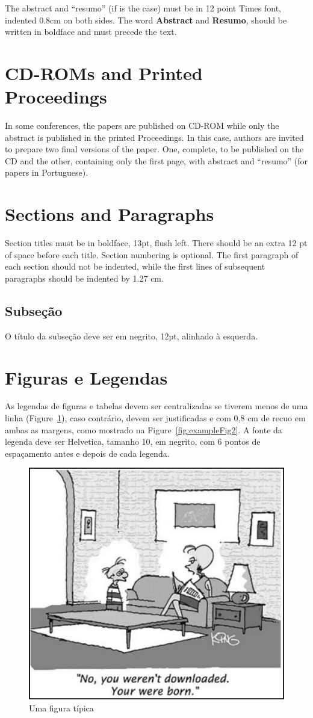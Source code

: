 \documentclass[12pt]{article}
\begin{document}
The abstract and ``resumo'' (if is the case) must be in 12 point Times font,
indented 0.8cm on both sides. The word \textbf{Abstract} and \textbf{Resumo},
should be written in boldface and must precede the text.

\section{CD-ROMs and Printed Proceedings}

In some conferences, the papers are published on CD-ROM while only the
abstract is published in the printed Proceedings. In this case, authors are
invited to prepare two final versions of the paper. One, complete, to be
published on the CD and the other, containing only the first page, with
abstract and ``resumo'' (for papers in Portuguese).

\section{Sections and Paragraphs}

Section titles must be in boldface, 13pt, flush left. There should be an extra
12 pt of space before each title. Section numbering is optional. The first
paragraph of each section should not be indented, while the first lines of
subsequent paragraphs should be indented by 1.27 cm.

\subsection{Subseção}

O título da subseção deve ser em negrito, 12pt, alinhado à esquerda.

\section{Figuras e Legendas}\label{sec:figs}

As legendas de figuras e tabelas devem ser centralizadas se tiverem menos de uma linha (Figure~\ref{fig:exampleFig1}), caso contrário, devem ser justificadas e com 0,8 cm de recuo em ambas as margens, como mostrado na Figure~\ref{fig:exampleFig2}. A fonte da legenda deve ser Helvetica, tamanho 10, em negrito, com 6 pontos de espaçamento antes e depois de cada legenda.

\begin{figure}[ht]
\centering
\includegraphics[width=.5\textwidth]{fig1.jpg}
\caption{Uma figura típica}
\label{fig:exampleFig1}
\end{figure}
\end{document}
